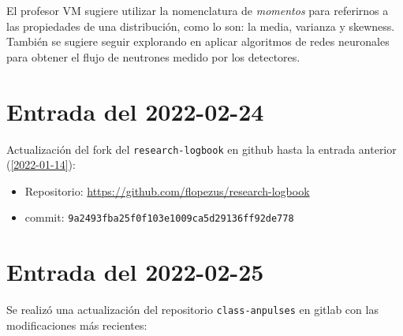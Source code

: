 \documentclass[11pt,letterpaper]{article}
\begin{document}
El profesor VM sugiere utilizar la nomenclatura de \textit{momentos} para referirnos a las propiedades de una distribución, como lo son: la media, varianza y skewness. También se sugiere seguir explorando en aplicar algoritmos de redes neuronales para obtener el flujo de neutrones medido por los detectores.

\section{Entrada del 2022-02-24}\label{2022-02-24}
Actualización del fork del \verb|research-logbook| en github hasta la entrada anterior (\ref{2022-01-14}):
\begin{itemize}
\item Repositorio: \url{https://github.com/flopezus/research-logbook} 
\item commit: \verb|9a2493fba25f0f103e1009ca5d29136ff92de778|
\end{itemize}

\section{Entrada del 2022-02-25}\label{2022-02-25}
Se realizó una actualización del repositorio \verb|class-anpulses| en gitlab con las modificaciones más recientes:
\end{document}
